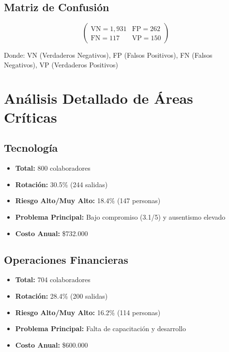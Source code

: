 \documentclass[11pt,a4paper,twoside]{article}
\begin{document}
\subsection{Matriz de Confusión}

\[
\begin{pmatrix}
\text{VN} = 1,931 & \text{FP} = 262 \\
\text{FN} = 117 & \text{VP} = 150
\end{pmatrix}
\]

Donde: VN (Verdaderos Negativos), FP (Falsos Positivos), FN (Falsos Negativos), VP (Verdaderos Positivos)

\newpage

\section{Análisis Detallado de Áreas Críticas}

\subsection{Tecnología}

\begin{itemize}
    \item \textbf{Total:} 800 colaboradores
    \item \textbf{Rotación:} 30.5\% (244 salidas)
    \item \textbf{Riesgo Alto/Muy Alto:} 18.4\% (147 personas)
    \item \textbf{Problema Principal:} Bajo compromiso (3.1/5) y ausentismo elevado
    \item \textbf{Costo Anual:} \$732.000
\end{itemize}

\subsection{Operaciones Financieras}

\begin{itemize}
    \item \textbf{Total:} 704 colaboradores
    \item \textbf{Rotación:} 28.4\% (200 salidas)
    \item \textbf{Riesgo Alto/Muy Alto:} 16.2\% (114 personas)
    \item \textbf{Problema Principal:} Falta de capacitación y desarrollo
    \item \textbf{Costo Anual:} \$600.000
\end{itemize}
\end{document}
